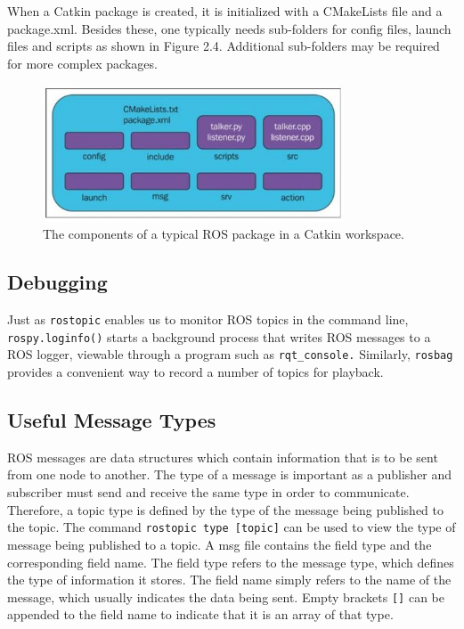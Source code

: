 \documentclass[twoside]{article}
\begin{document}
When a Catkin package is created, it is initialized with a CMakeLists file and a package.xml. Besides these, one typically needs sub-folders for config files, launch files and scripts as shown in Figure 2.4. Additional sub-folders may be required for more complex packages.
\begin{figure}[ht]
\centering
\includegraphics[width=0.8\textwidth]{ROSPackage}
\caption{The components of a typical ROS package in a Catkin workspace.}
\end{figure}

\subsection{Debugging}
Just as \verb|rostopic| enables us to monitor ROS topics in the command line, \verb|rospy.loginfo()| starts a background process that writes ROS messages to a ROS logger, viewable through a program such as \verb|rqt_console.|
Similarly, \verb|rosbag| provides a convenient way to record a number of topics for playback.

\subsection{Useful Message Types}
ROS messages are data structures which contain information that is to be sent from one node to another. The type of a message is important as a publisher and subscriber must send and receive the same type in order to communicate. Therefore, a topic type is defined by the type of the message being published to the topic. The command \texttt{rostopic type [topic]} can be used to view the type of message being published to a topic. A msg file contains the field type and the corresponding field name. The field type refers to the message type, which defines the type of information it stores. The field name simply refers to the name of the message, which usually indicates the data being sent. Empty brackets \texttt{[]} can be appended to the field name to indicate that it is an array of that type.
\end{document}
